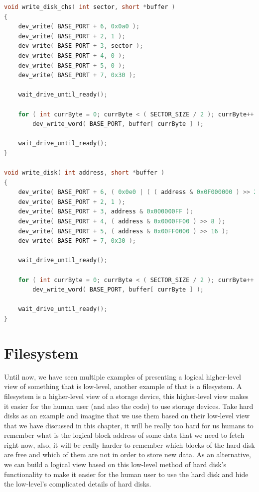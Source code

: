 \begin{lstlisting}[language=C]
void write_disk_chs( int sector, short *buffer )
{
    dev_write( BASE_PORT + 6, 0x0a0 );
    dev_write( BASE_PORT + 2, 1 );
    dev_write( BASE_PORT + 3, sector );
    dev_write( BASE_PORT + 4, 0 );
    dev_write( BASE_PORT + 5, 0 );
    dev_write( BASE_PORT + 7, 0x30 );
    
    wait_drive_until_ready();
    
    for ( int currByte = 0; currByte < ( SECTOR_SIZE / 2 ); currByte++ )
        dev_write_word( BASE_PORT, buffer[ currByte ] );
    
    wait_drive_until_ready();
}

void write_disk( int address, short *buffer )
{
    dev_write( BASE_PORT + 6, ( 0x0e0 | ( ( address & 0x0F000000 ) >> 24 ) ) );
    dev_write( BASE_PORT + 2, 1 );
    dev_write( BASE_PORT + 3, address & 0x000000FF );
    dev_write( BASE_PORT + 4, ( address & 0x0000FF00 ) >> 8 );
    dev_write( BASE_PORT + 5, ( address & 0x00FF0000 ) >> 16 );
    dev_write( BASE_PORT + 7, 0x30 );
    
    wait_drive_until_ready();
    
    for ( int currByte = 0; currByte < ( SECTOR_SIZE / 2 ); currByte++ )
        dev_write_word( BASE_PORT, buffer[ currByte ] );
        
    wait_drive_until_ready();
}
\end{lstlisting}

\section{Filesystem}\label{filesystem}

Until now, we have seen multiple examples of presenting a logical
higher-level view of something that is low-level, another example of
that is a filesystem. A filesystem is a higher-level view of a storage
device, this higher-level view makes it easier for the human user (and
also the code) to use storage devices. Take hard disks as an example and
imagine that we use them based on their low-level view that we have
discussed in this chapter, it will be really too hard for us humans to
remember what is the logical block address of some data that we need to
fetch right now, also, it will be really harder to remember which blocks
of the hard disk are free and which of them are not in order to store
new data. As an alternative, we can build a logical view based on this
low-level method of hard disk's functionality to make it easier for the
human user to use the hard disk and hide the low-level's complicated
details of hard disks.

